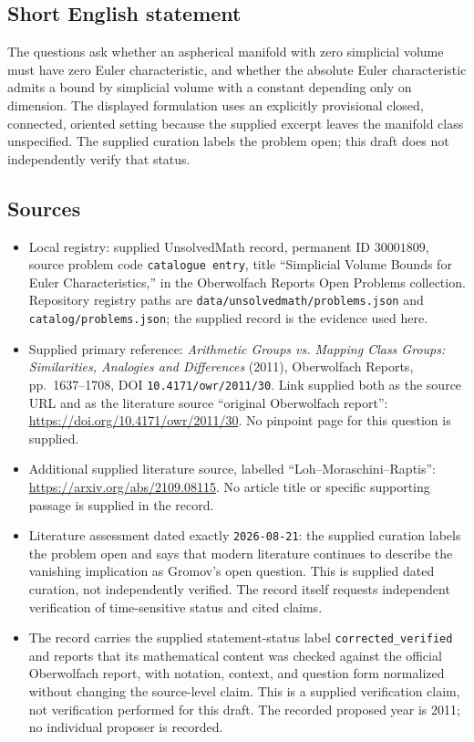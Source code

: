 \documentclass[11pt]{article}
\begin{document}
\subsection{Short English statement}
The questions ask whether an aspherical manifold with zero simplicial volume must have zero Euler characteristic, and whether the absolute Euler characteristic admits a bound by simplicial volume with a constant depending only on dimension. The displayed formulation uses an explicitly provisional closed, connected, oriented setting because the supplied excerpt leaves the manifold class unspecified. The supplied curation labels the problem open; this draft does not independently verify that status.
\subsection{Sources}
\begin{itemize}
\item Local registry: supplied UnsolvedMath record, permanent ID \(30001809\), source problem code \texttt{catalogue entry}, title ``Simplicial Volume Bounds for Euler Characteristics,'' in the Oberwolfach Reports Open Problems collection. Repository registry paths are \texttt{data/unsolvedmath/problems.json} and \texttt{catalog/problems.json}; the supplied record is the evidence used here.
\item Supplied primary reference: \emph{Arithmetic Groups vs. Mapping Class Groups: Similarities, Analogies and Differences} (2011), Oberwolfach Reports, pp.\ 1637--1708, DOI \texttt{10.4171/owr/2011/30}. Link supplied both as the source URL and as the literature source ``original Oberwolfach report'': \url{https://doi.org/10.4171/owr/2011/30}. No pinpoint page for this question is supplied.
\item Additional supplied literature source, labelled ``Loh--Moraschini--Raptis'': \url{https://arxiv.org/abs/2109.08115}. No article title or specific supporting passage is supplied in the record.
\item Literature assessment dated exactly \texttt{2026-08-21}: the supplied curation labels the problem open and says that modern literature continues to describe the vanishing implication as Gromov's open question. This is supplied dated curation, not independently verified. The record itself requests independent verification of time-sensitive status and cited claims.
\item The record carries the supplied statement-status label \texttt{corrected\_verified} and reports that its mathematical content was checked against the official Oberwolfach report, with notation, context, and question form normalized without changing the source-level claim. This is a supplied verification claim, not verification performed for this draft. The recorded proposed year is 2011; no individual proposer is recorded.
\end{itemize}
\end{document}
